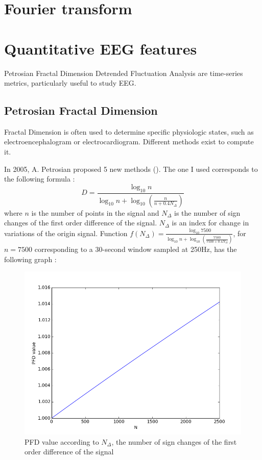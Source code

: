 \documentclass[12pt]{report}
\begin{document}
\begin{appendices}
\chapter{Fourier transform}\label{chap:Fourier}

\chapter{Quantitative EEG features}\label{chap:Quantitative EEG features}

Petrosian Fractal Dimension Detrended Fluctuation Analysis are time-series metrics, particularly useful to study EEG.

\section{Petrosian Fractal Dimension}\label{section:Petrosian Fractal Dimension}

Fractal Dimension is often used to determine specific physiologic states, such as electroencephalogram or electrocardiogram. Different methods exist to compute it. 

In 2005, A. Petrosian proposed 5 new methods (\cite{petrosian1995kolmogorov}). The one I used corresponds to the following formula :
\begin{equation}
D=\frac{\log_{10} n}{\log_{10} n + \log_{10} (\frac{n}{n+0.4N_{\Delta}})}
\end{equation}
where $n$ is the number of points in the signal and $N_{\Delta}$ is the number of sign changes of the first order difference of the signal. $N_{\Delta}$ is an index for change in variations of the origin signal. Function $f(N_{\Delta}) = \frac{\log_{10} 7500}{\log_{10} n + \log_{10} (\frac{7500}{7500+0.4N_{\Delta}})}$, for $n=7500$ corresponding to a 30-second window sampled at 250Hz, has the following graph :

\begin{figure}[H]
\centering
\includegraphics[width=.3\textwidth]{img/appen/pfd_func.png}
\caption{\label{fig:pfd_func}PFD value according to $N_{\Delta}$, the number of sign changes of the first order difference of the signal}
\end{figure}


\end{appendices}
\end{document}
